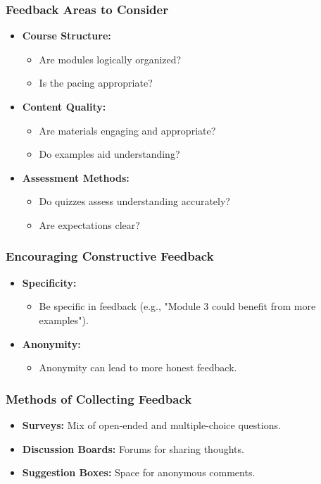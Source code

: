 \documentclass[aspectratio=169]{beamer}
\begin{document}
\begin{frame}[fragile]
    \frametitle{Feedback Areas to Consider}
    \begin{itemize}
        \item \textbf{Course Structure:}
        \begin{itemize}
            \item Are modules logically organized?
            \item Is the pacing appropriate?
        \end{itemize}
        \item \textbf{Content Quality:}
        \begin{itemize}
            \item Are materials engaging and appropriate?
            \item Do examples aid understanding?
        \end{itemize}
        \item \textbf{Assessment Methods:}
        \begin{itemize}
            \item Do quizzes assess understanding accurately?
            \item Are expectations clear?
        \end{itemize}
    \end{itemize}
\end{frame}

\begin{frame}[fragile]
    \frametitle{Encouraging Constructive Feedback}
    \begin{itemize}
        \item \textbf{Specificity:} 
        \begin{itemize}
            \item Be specific in feedback (e.g., "Module 3 could benefit from more examples").
        \end{itemize}
        \item \textbf{Anonymity:}
        \begin{itemize}
            \item Anonymity can lead to more honest feedback.
        \end{itemize}
    \end{itemize}
\end{frame}

\begin{frame}[fragile]
    \frametitle{Methods of Collecting Feedback}
    \begin{itemize}
        \item \textbf{Surveys:} Mix of open-ended and multiple-choice questions.
        \item \textbf{Discussion Boards:} Forums for sharing thoughts.
        \item \textbf{Suggestion Boxes:} Space for anonymous comments.
    \end{itemize}
\end{frame}
\end{document}
